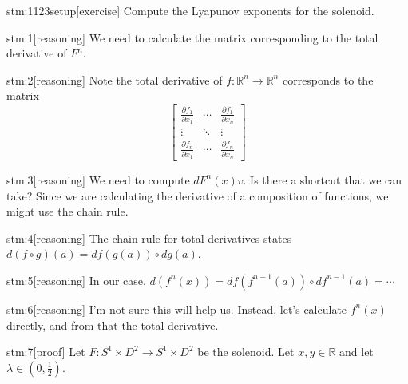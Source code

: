 \documentclass{article}
\begin{document}

\begin{stm}{stm:1123setup}[exercise]
Compute the Lyapunov exponents for the solenoid.
\end{stm}


\begin{stm}{stm:1}[reasoning]
We need to calculate the matrix corresponding to the total derivative of $F^n$.
\end{stm}

\begin{stm}{stm:2}[reasoning]
Note the total derivative of $f \colon \mathbb{R}^n \to \mathbb{R}^n$ corresponds to the matrix
\[
\left[
\begin{array}{ccc}
\frac{\partial f_1}{\partial x_1} & \cdots & \frac{\partial f_1}{\partial x_n} \\
\vdots & \ddots & \vdots \\
\frac{\partial f_n}{\partial x_1} & \cdots & \frac{\partial f_n}{\partial x_n}
\end{array}
\right]
\]
\end{stm}

\begin{stm}{stm:3}[reasoning]
We need to compute $dF^n(x)v$. Is there a shortcut that we can take? Since we are calculating the derivative of a composition of functions, we might use the chain rule.
\end{stm}

\begin{stm}{stm:4}[reasoning]
The chain rule for total derivatives states $d(f \circ g)(a) = df(g(a)) \circ dg(a)$.
\end{stm}

\begin{stm}{stm:5}[reasoning]
In our case, $d(f^n(x)) = df(f^{n-1}(a)) \circ df^{n-1}(a) = \cdots$
\end{stm}

\begin{stm}{stm:6}[reasoning]
I'm not sure this will help us. Instead, let's calculate $f^n(x)$ directly, and from that the total derivative.
\end{stm}

\begin{stm}{stm:7}[proof]
Let $F \colon S^1 \times D^2 \to S^1 \times D^2$ be the solenoid. Let $x, y \in \mathbb{R}$ and let $\lambda \in (0, \frac{1}{2})$.
\end{stm}
\end{document}
